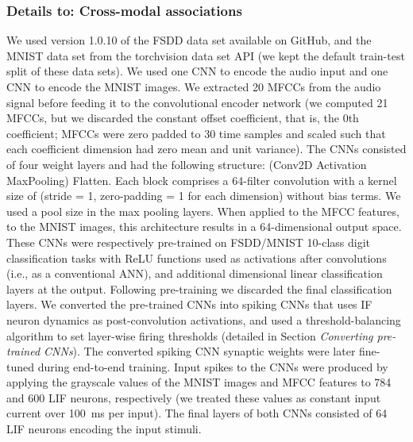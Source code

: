 \documentclass{article}
\begin{document}
\subsubsection*{Details to: Cross-modal associations}
We used version 1.0.10 of the FSDD data set available on GitHub, and the MNIST data set from the torchvision data set API (we kept the default train-test split of these data sets). We used one \gls{CNN} to encode the audio input and one \gls{CNN} to encode the MNIST images. We extracted \num{20} \glspl{MFCC} from the audio signal before feeding it to the convolutional encoder network (we computed \num{21} \glspl{MFCC}, but we discarded the constant offset coefficient, that is, the \num{0}th coefficient; \glspl{MFCC} were zero padded to \num{30} time samples and scaled such that each coefficient dimension had zero mean and unit variance).
The \glspl{CNN} consisted of four weight layers and had the following structure:   (Conv2D  Activation  MaxPooling)  Flatten. Each block comprises a \num{64}-filter convolution with a kernel size of  (stride = \num{1}, zero-padding = \num{1} for each dimension) without bias terms. We used a  pool size in the max pooling layers. 
When applied to the  \gls{MFCC} features, to the  MNIST images, this architecture results in a \num{64}-dimensional output space. 
These \glspl{CNN} were respectively pre-trained on FSDD/MNIST \num{10}-class digit classification tasks with ReLU functions used as activations after convolutions (i.e., as a conventional \gls{ANN}), and additional  dimensional linear classification layers at the output.
Following pre-training we discarded the final classification layers.
We converted the pre-trained \glspl{CNN} into spiking \glspl{CNN} that uses \gls{IF} neuron dynamics as post-convolution activations, and used a threshold-balancing algorithm to set layer-wise firing thresholds \cite{diehl2015fast,sengupta2019going} (detailed in Section \emph{Converting pre-trained CNNs}).
The converted spiking \gls{CNN} synaptic weights were later fine-tuned during end-to-end training.
Input spikes to the \glspl{CNN} were produced by applying the grayscale values of the MNIST images and \gls{MFCC} features to \num{784} and \num{600} \gls{LIF} neurons, respectively (we treated these values as constant input current over \SI{100}{\ms} per input).
The final layers of both \glspl{CNN} consisted of \num{64} \gls{LIF} neurons encoding the input stimuli.
\end{document}
